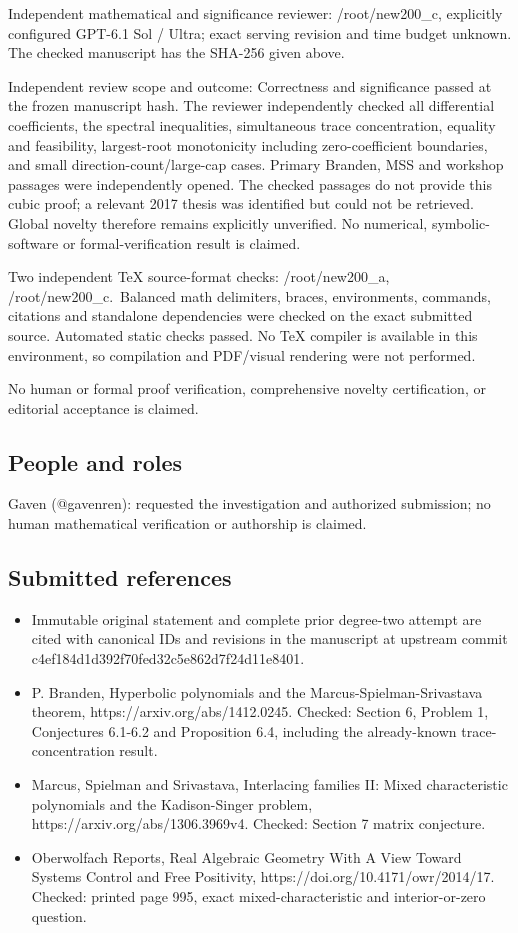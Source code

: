 \documentclass[11pt]{article}
\begin{document}
Independent mathematical and significance reviewer: /root/new200\_c, explicitly configured GPT-6.1 Sol / Ultra; exact serving revision and time budget unknown. The checked manuscript has the SHA-256 given above.

Independent review scope and outcome: Correctness and significance passed at the frozen manuscript hash. The reviewer independently checked all differential coefficients, the spectral inequalities, simultaneous trace concentration, equality and feasibility, largest-root monotonicity including zero-coefficient boundaries, and small direction-count/large-cap cases. Primary Branden, MSS and workshop passages were independently opened. The checked passages do not provide this cubic proof; a relevant 2017 thesis was identified but could not be retrieved. Global novelty therefore remains explicitly unverified. No numerical, symbolic-software or formal-verification result is claimed.

Two independent TeX source-format checks: /root/new200\_a, /root/new200\_c.~Balanced math delimiters, braces, environments, commands, citations and standalone dependencies were checked on the exact submitted source. Automated static checks passed. No TeX compiler is available in this environment, so compilation and PDF/visual rendering were not performed.

No human or formal proof verification, comprehensive novelty certification, or editorial acceptance is claimed.

\subsection{People and roles}

Gaven (@gavenren): requested the investigation and authorized submission; no human mathematical verification or authorship is claimed.

\subsection{Submitted references}

\begin{itemize}
\item
  Immutable original statement and complete prior degree-two attempt are cited with canonical IDs and revisions in the manuscript at upstream commit c4ef184d1d392f70fed32c5e862d7f24d11e8401.
\item
  P. Branden, Hyperbolic polynomials and the Marcus-Spielman-Srivastava theorem, https://arxiv.org/abs/1412.0245. Checked: Section 6, Problem 1, Conjectures 6.1-6.2 and Proposition 6.4, including the already-known trace-concentration result.
\item
  Marcus, Spielman and Srivastava, Interlacing families II: Mixed characteristic polynomials and the Kadison-Singer problem, https://arxiv.org/abs/1306.3969v4. Checked: Section 7 matrix conjecture.
\item
  Oberwolfach Reports, Real Algebraic Geometry With A View Toward Systems Control and Free Positivity, https://doi.org/10.4171/owr/2014/17. Checked: printed page 995, exact mixed-characteristic and interior-or-zero question.
\end{itemize}
\end{document}
